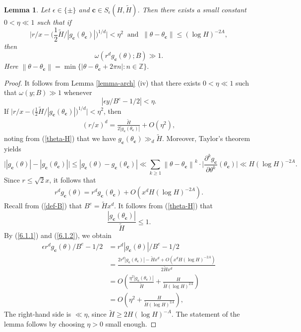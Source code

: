 \documentclass[reqno, 11pt]{amsart}
\renewcommand{\leq}{\leqslant}
\renewcommand{\geq}{\geqslant}
\newtheorem{lemma}[theorem]{Lemma}
\theoremstyle{definition}
\theoremstyle{definition}
\renewcommand{\geq}{\geqslant}
\renewcommand{\leq}{\leqslant}
\newcommand{\norm}[1]{\left\lVert#1\right\rVert}
\newcommand{\cc}{\mathbf{c}}
\newcommand{\pa}{\partial}
\newcommand{\ZZ}{\mathbb{Z}}
\numberwithin{equation}{section}
\begin{document}
\begin{lemma}\label{lbd-arc}
Let $\epsilon \in \{\pm\}$ and $\cc \in S_\epsilon(H, \tilde{H})$.
    Then there exists a small constant $0 < \eta \ll 1$ such that if
    $$\Big|r/x - \Big(\frac{1}{2}\tilde{H}/|g_\cc(\theta_\cc)|\Big)^{1/d} \Big| < \eta^2 \ \text{ and } \ \norm{\theta - \theta_\cc} \leq (\log H)^{-2A},$$
    then
    $$\omega(r^d g_\cc(\theta); B) \gg 1.$$
    Here $\norm{\theta - \theta_\cc} = \min \{|\theta - \theta_\cc + 2\pi n|: n \in \ZZ \}.$
\end{lemma}
\begin{proof}
    It follows from Lemma \ref{lemma-arch} (iv) that there exists $0 < \eta \ll 1$ such that $\omega(y; B) \gg 1$ whenever 
    $$|\epsilon y/B^e - 1/2| < \eta.$$ 
    If $\big|r/x - \big(\frac{1}{2}\tilde{H}/|g_\cc(\theta_\cc)|\big)^{1/d} \big| < \eta^2$, then 
    \begin{align}\label{6.1.1}
    	(r/x)^d = \frac{\tilde{H}}{2|g_\cc(\theta_\cc)|} + O(\eta^2),
    \end{align}
    noting from (\ref{theta-H}) that we have $g_\cc(\theta_\cc) \gg_d \tilde{H}$.
	Moreover, Taylor's theorem yields
	$$\Big||g_\cc(\theta)| - |g_\cc(\theta_\cc)|\Big| \leq |g_\cc(\theta) - g_\cc(\theta_\cc)| \ll \sum_{k \geq 1} \norm{\theta - \theta_\cc}^k \cdot \Big| \frac{\pa^k g_\cc}{\pa \theta^k} (\theta_\cc) \Big| \ll H(\log H)^{-2A}. $$
	Since $r \leq \sqrt{2}x$, it follows that
	\begin{align}\label{6.1.2}
		r^d g_\cc(\theta) = r^d g_\cc(\theta_\cc) + O(x^dH(\log H)^{-2A}). 
	\end{align}
	Recall from (\ref{def-B}) that $B^e = \tilde{H}x^d$. It follows from (\ref{theta-H}) that 
	$$\frac{|g_\cc(\theta_\cc)|}{\tilde{H}} \leq 1.$$ By (\ref{6.1.1}) and (\ref{6.1.2}), we obtain 
	\begin{align*}
	    \epsilon r^d g_\cc(\theta) / B^e - 1/2 &  = r^d |g_\cc(\theta)| / B^e - 1/2  \\
		 &  = \frac{2r^d |g_\cc(\theta_\cc)| - \tilde{H}x^d + O(x^dH(\log H)^{-2A})}{2\tilde{H}x^d} \\
		 &  = O \left( \frac{\eta^2|g_\cc(\theta_\cc)|}{\tilde{H}} + \frac{H}{\tilde{H}(\log H)^{2A}} \right) \\
		 & = O\left(\eta^2 + \frac{H}{\tilde{H}(\log H)^{2A}} \right),
	\end{align*}
	The right-hand side is $\ll \eta$, since $\tilde{H} \geq 2H(\log H)^{-A}$. The statement of the lemma follows by choosing $\eta > 0$ small enough.
\end{proof}
\end{document}
